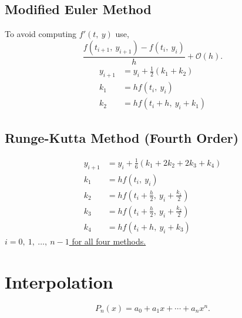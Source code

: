 \documentclass{article}
\begin{document}
\begin{multicols}{3}
    \subsection{Modified Euler Method}
    To avoid computing \(f'\left( t,\: y \right)\) use,
    \begin{equation*}
        \frac{f\left( t_{i + 1},\: y_{i + 1} \right) - f\left( t_i,\: y_i \right)}{h} + \mathcal{O}\left( h \right).
    \end{equation*}
    \begin{align*}
        y_{i + 1} & = y_i + \frac{1}{2} \left( k_1 + k_2 \right) \\
        k_1       & = h f\left( t_i,\: y_i \right)               \\
        k_2       & = h f\left( t_i + h,\: y_i + k_1 \right)
    \end{align*}
    \subsection{Runge-Kutta Method (Fourth Order)}
    \begin{align*}
        y_{i + 1} & = y_i + \frac{1}{6} \left( k_1 + 2 k_2 + 2 k_3 + k_4 \right) \\
        k_1       & = h f\left( t_i,\: y_i \right)                               \\
        k_2       & = h f\left( t_i + \frac{h}{2},\: y_i + \frac{k_1}{2} \right) \\
        k_3       & = h f\left( t_i + \frac{h}{2},\: y_i + \frac{k_2}{2} \right) \\
        k_4       & = h f\left( t_i + h,\: y_i + k_3 \right)
    \end{align*}
    \underline{\(i = 0,\: 1,\: \ldots,\: n - 1\) for all four methods.}
    \section{Interpolation}
    \begin{equation*}
        P_n\left( x \right) = a_0 + a_1 x + \cdots + a_n x^n.
    \end{equation*}

\end{multicols}
\end{document}
